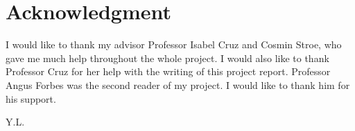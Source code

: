 \section*{Acknowledgment}
I would like to thank my advisor Professor Isabel Cruz and Cosmin
Stroe, who gave me much help throughout the whole project. I would
also like to thank Professor Cruz for her help with the writing of
this project report. Professor Angus Forbes was the second reader of
my project. I would like to thank him for his support.\\

\begin{flushright}
Y.L.\\[1pc]
\end{flushright}